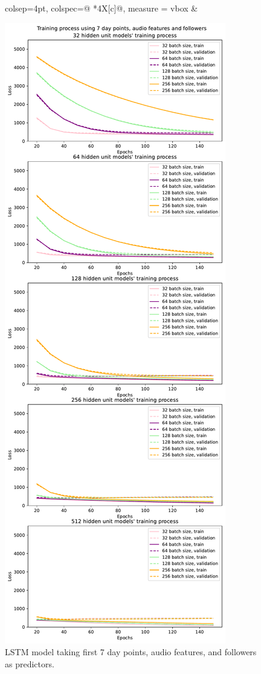\documentclass{article}
\begin{document}
\begin{figure}[H]
\begin{adjustwidth}{-1.5cm}{-1.5cm}
\begin{tblr}{colsep=4pt,
             colspec={@{} *{4}{X[c]}@{}}, 
             measure = vbox}
        &
       
            \includegraphics[width=\linewidth]{figures/hyperparameters_points_audio_followers_training.pdf}
            \caption{LSTM model taking first 7 day points, audio features, and followers as predictors.}
            \label{fig:hyper4}
      

\end{tblr}
\end{adjustwidth}
\end{figure}
\end{document}
